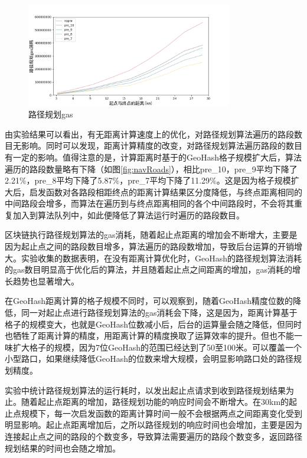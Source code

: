 \begin{figure}[h]
  \centering
  \includegraphics[height=0.3\textheight,width=0.8\textwidth]{figures/路径规划gas}
  \caption{路径规划gas}\label{fig:navGas}
\end{figure}

由实验结果可以看出，有无距离计算速度上的优化，对路径规划算法遍历的路段数目无影响。同时可以发现，距离计算精度的改变，对路径规划算法遍历路段的数目有一定的影响。值得注意的是，计算距离时基于的GeoHash格子规模扩大后，算法遍历的路段数量略有下降（如图\ref{fig:navRoads}），相比pre\_10，pre\_9平均下降了2.21$\%$，pre\_8平均下降了5.87$\%$，pre\_7平均下降了11.29$\%$。这是因为格子规模扩大后，启发函数对各路段相距终点的距离计算结果区分度降低，与终点距离相同的中间路段会增多，而算法在遍历到与终点距离相同的各个中间路段时，不会将其重复加入到算法队列中，如此便降低了算法运行时遍历的路段数目。

区块链执行路径规划算法的gas消耗，随着起止点距离的增加会不断增大，主要是因为起止点之间的路段数目增多，算法遍历的路段数增加，导致后台运算的开销增大。实验收集的数据表明，在没有距离计算优化时，GeoHash的路径规划算法消耗的gas数目明显高于优化后的算法，并且随着起止点之间距离的增加，gas消耗的增长趋势也显著增大。

​在GeoHash距离计算的格子规模不同时，可以观察到，随着GeoHash精度位数的降低，同一对起止点进行路径规划算法的gas消耗会下降，这是因为，距离计算基于格子的规模变大，也就是GeoHash位数减小后，后台的运算量会随之降低，但同时也牺牲了距离计算的精度，用距离计算的精度换取了运算效率的提升。但也不能一味扩大格子的规模，因为7位GeoHash的范围已经达到了50至100米。可以覆盖一个小型路口，如果继续降低GeoHash的位数来增大规模，会明显影响路口处的路径规划精度。

实验中统计路径规划算法的运行耗时，以发出起止点请求到收到路径规划结果为止。随着起止点距离的增加，路径规划功能的响应时间会不断增大。在30km的起止点规模下，每一次启发函数的距离计算时间一般不会根据两点之间距离变化受到明显影响。起止点距离增加后，之所以路径规划的响应时间也会增加，主要是因为连接起止点之间的路段的个数变多，导致算法需要遍历的路段个数变多，返回路径规划结果的时间也会随之增加。

